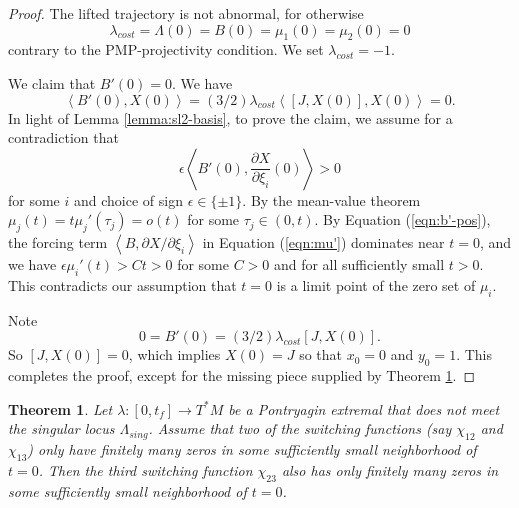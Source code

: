 \documentclass{article}
\newtheorem{theorem}{Theorem}[subsection]
\theoremstyle{remark}
\newcommand{\ang}[1]{\left\langle{#1}\right\rangle}
\newcommand\Lsing{\Lambda_{sing}}
\newcommand{\partials}[2]{\frac{\partial #1}{\partial #2}}
\begin{document}
\begin{proof}
The lifted trajectory is not abnormal, for otherwise 
\[
\lambda_{cost} =
\Lambda(0)=B(0)=\mu_1(0)=\mu_2(0)=0
\]
 contrary to the PMP-projectivity condition.
We set $\lambda_{cost}=-1$.


We claim that $B'(0)=0$. We have
\[
\ang{B'(0),X(0)} = (3/2)\lambda_{cost}\ang{[J,X(0)],X(0)} = 0.
\]
In light of Lemma \ref{lemma:sl2-basis}, to prove the claim, we  assume for a
contradiction that
\begin{equation}\label{eqn:b'-pos}
\epsilon\ang{B'(0),\partials{X}{\xi_i}(0)}>0
\end{equation}
for some $i$ and choice of sign $\epsilon\in\{\pm 1\}$.  By the
mean-value theorem $\mu_j(t) = t\mu_j'(\tau_j) = o(t)$ for some
$\tau_j\in (0,t)$.  By Equation (\ref{eqn:b'-pos}), the forcing term
$\ang{B,\partial X/\partial \xi_i}$ in Equation (\ref{eqn:mu'})
dominates near $t=0$, and we have $\epsilon \mu_i'(t) > C t >0$ for
some $C>0$ and for all sufficiently small $t>0$.  This contradicts our
assumption that $t=0$ is a limit point of the zero set of $\mu_i$.

Note
\[
0=B'(0)=(3/2)\lambda_{cost} [J,X(0)].
\]
So $[J,X(0)]=0$,  which implies $X(0) = J$ so that $x_0=0$ and $y_0=1$.
This completes the proof, except for the missing piece supplied by 
Theorem \ref{lemma:no-chatter2}.
\end{proof}

\begin{theorem}\label{lemma:no-chatter2}
  Let $\lambda:[0,t_f]\to T^*M$ be a Pontryagin extremal that does not
  meet the singular locus $\Lsing$.  Assume that two of the switching
  functions (say $\chi_{12}$ and $\chi_{13}$) only have finitely many zeros
  in some sufficiently small neighborhood of $t=0$.  Then the third
  switching function $\chi_{23}$ also has only finitely many zeros in
  some sufficiently small neighborhood of $t=0$.
\end{theorem}
\end{document}
